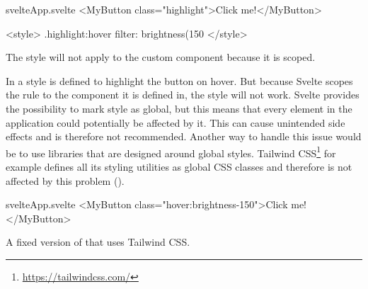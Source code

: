 \begin{listing}[H]
\begin{myminted}{svelte}{App.svelte}
<MyButton class="highlight">Click me!</MyButton>

<style>
  .highlight:hover {
    filter: brightness(150%
  }
</style>
\end{myminted}
\caption{The style will not apply to the custom component because it is scoped.}
\label{fig:evaluation-styling-scope}
\end{listing}

In  a style is defined to highlight the button on hover. But because Svelte scopes the rule to the component it is defined in, the style will not work. Svelte provides the possibility to mark style as global, but this means that every element in the application could potentially be affected by it. This can cause unintended side effects and is therefore not recommended. Another way to handle this issue would be to use libraries that are designed around global styles. Tailwind CSS\footnote{\url{https://tailwindcss.com/}} for example defines all its styling utilities as global CSS classes and therefore is not affected by this problem ().

\begin{listing}[H]
\begin{myminted}{svelte}{App.svelte}
  <MyButton class="hover:brightness-150">Click me!</MyButton>
\end{myminted}
\caption{A fixed version of  that uses Tailwind CSS.}
\label{fig:evaluation-styling-tailwind}
\end{listing}





